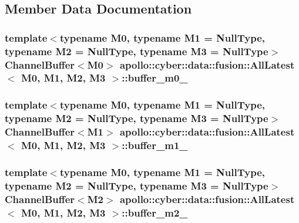 \subsection{Member Data Documentation}
\hypertarget{classapollo_1_1cyber_1_1data_1_1fusion_1_1AllLatest_a55f4ad5862771d69f0c15c6fbef8bf48}{
\subsubsection[{buffer\-\_\-m0\-\_\-}]{\setlength{\rightskip}{0pt plus 5cm}template$<$typename M0, typename M1 = Null\-Type, typename M2 = Null\-Type, typename M3 = Null\-Type$>$ {\bf Channel\-Buffer}$<$M0$>$ {\bf apollo\-::cyber\-::data\-::fusion\-::\-All\-Latest}$<$ M0, M1, M2, M3 $>$\-::buffer\-\_\-m0\-\_\-\hspace{0.3cm}{\ttfamily [private]}}}\label{classapollo_1_1cyber_1_1data_1_1fusion_1_1AllLatest_a55f4ad5862771d69f0c15c6fbef8bf48}
\hypertarget{classapollo_1_1cyber_1_1data_1_1fusion_1_1AllLatest_ac74a96b814c80ecdd431a18c60ff5af9}{
\subsubsection[{buffer\-\_\-m1\-\_\-}]{\setlength{\rightskip}{0pt plus 5cm}template$<$typename M0, typename M1 = Null\-Type, typename M2 = Null\-Type, typename M3 = Null\-Type$>$ {\bf Channel\-Buffer}$<$M1$>$ {\bf apollo\-::cyber\-::data\-::fusion\-::\-All\-Latest}$<$ M0, M1, M2, M3 $>$\-::buffer\-\_\-m1\-\_\-\hspace{0.3cm}{\ttfamily [private]}}}\label{classapollo_1_1cyber_1_1data_1_1fusion_1_1AllLatest_ac74a96b814c80ecdd431a18c60ff5af9}
\hypertarget{classapollo_1_1cyber_1_1data_1_1fusion_1_1AllLatest_aa7a73968cc0be58137c8f5f5125d9ffd}{
\subsubsection[{buffer\-\_\-m2\-\_\-}]{\setlength{\rightskip}{0pt plus 5cm}template$<$typename M0, typename M1 = Null\-Type, typename M2 = Null\-Type, typename M3 = Null\-Type$>$ {\bf Channel\-Buffer}$<$M2$>$ {\bf apollo\-::cyber\-::data\-::fusion\-::\-All\-Latest}$<$ M0, M1, M2, M3 $>$\-::buffer\-\_\-m2\-\_\-\hspace{0.3cm}{\ttfamily [private]}}}\label{classapollo_1_1cyber_1_1data_1_1fusion_1_1AllLatest_aa7a73968cc0be58137c8f5f5125d9ffd}

